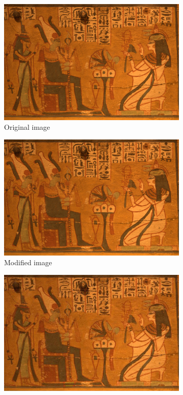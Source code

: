 \documentclass[12pt]{article}
\begin{document}
\begin{figure}
\centering
\begin{subfigure}{.5\textwidth}
  \centering
  \includegraphics[width=.8\linewidth]{./gfx/egyptian.png}
  \caption{Original image}
  \label{fig:sub1}
\end{subfigure}%
\begin{subfigure}{.5\textwidth}
  \centering
  \includegraphics[width=.8\linewidth]{./gfx/egyptian_mod.png}
  \caption{Modified image}
  \label{fig:sub2}
\end{subfigure}
\begin{subfigure}{.5\textwidth}
  \centering
  \includegraphics[width=.8\linewidth]{./gfx/egyptian_none.jpg}

\end{subfigure}
\end{figure}
\end{document}
